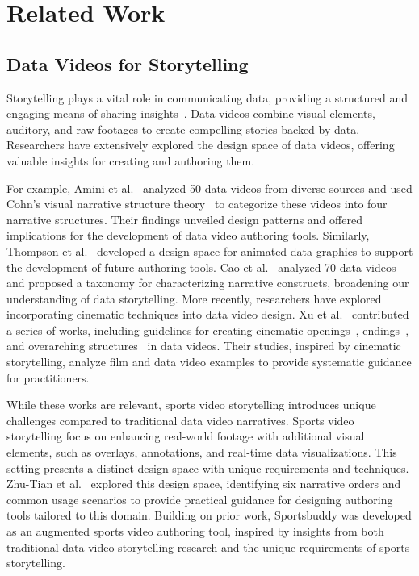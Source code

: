 \section{Related Work}

\subsection{Data Videos for Storytelling}

Storytelling plays a vital role in communicating data, providing a structured and engaging means of sharing insights~\cite{}. 
Data videos combine visual elements, auditory, and raw footages to create compelling stories backed by data. 
Researchers have extensively explored the design space of data videos, 
offering valuable insights for creating and authoring them.

For example, Amini et al.~\cite{} analyzed 50 data videos from diverse sources and used Cohn's visual narrative structure theory~\cite{} to categorize these videos into four narrative structures.
Their findings unveiled design patterns and offered implications for the development of data video authoring tools.
Similarly, Thompson et al.~\cite{} developed a design space for animated data graphics to support the development of future authoring tools. 
Cao et al.~\cite{} analyzed 70 data videos and proposed a taxonomy for characterizing narrative constructs, broadening our understanding of data storytelling.
More recently, researchers have explored incorporating cinematic techniques into data video design.
Xu et al.~\cite{} contributed a series of works, including guidelines for creating cinematic openings~\cite{}, endings~\cite{}, and overarching structures~\cite{} in data videos. 
Their studies, inspired by cinematic storytelling, analyze film and data video examples to provide systematic guidance for practitioners.

While these works are relevant, sports video storytelling introduces unique challenges compared to traditional data video narratives.
Sports video storytelling focus on enhancing real-world footage with additional visual elements, such as overlays, annotations, and real-time data visualizations.
This setting presents a distinct design space with unique requirements and techniques.
Zhu-Tian et al.~\cite{} explored this design space, identifying six narrative orders and common usage scenarios to provide practical guidance for designing authoring tools tailored to this domain.
Building on prior work, Sportsbuddy was developed as an augmented sports video authoring tool, inspired by insights from both traditional data video storytelling research and the unique requirements of sports storytelling.

